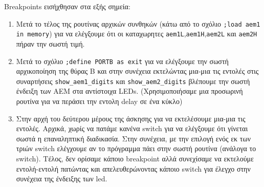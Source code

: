 Breakpoints εισήχθησαν στα εξής σημεία:
\begin{enumerate}
\item Μετά το τέλος της ρουτίνας αρχικών συνθηκών
(κάτω από το σχόλιο \lstinline[breaklines=true]!;load aem1 in memory!) για να ελέγξουμε ότι οι καταχωρητες
\lstinline!aem1L!,\lstinline!aem1H!,\lstinline!aem2L! και \lstinline!aem2H! πήραν την σωστή τιμή.
\item Μετά το σχόλιο \lstinline[breaklines=true]!;define PORTB as exit! για να ελέγξουμε την σωστή
αρχικοποίηση της θύρας Β και στην συνέχεια εκτελώντας μια-μια τις
εντολές στις συναρτήσεις \lstinline!show_aem1_digits! και \lstinline!show_aem2_digits!
βλέπουμε την σωστή ένδειξη των ΑΕΜ στα αντίστοιχα LEDs.
(Χρησιμοποιήσαμε μια προσωρινή ρουτίνα για να περάσει την εντολη delay σε ένα κύκλο)
\item Στην αρχή του δεύτερου μέρους της άσκησης για να εκτελέσουμε μια-μια τις εντολές. 
Αρχικά, χωρίς να πατάμε κανένα switch για να ελέγξουμε ότι γίνεται σωστά η επαναληπτική διαδικασία.
Στην συνέχεια, με την επιλογή ενός εκ των τριών switch ελέγχουμε αν το πρόγραμμα πάει στην σωστή ρουτίνα (ανάλογα το switch).
Τέλος, δεν ορίσαμε κάποιο breakpoint αλλά συνεχίσαμε να εκτελούμε εντολή-εντολή πατώντας και απελευθερώνοντας κάποιο switch
για έλεγχο στην συνέχεια της ένδειξης των led.
\end{enumerate}